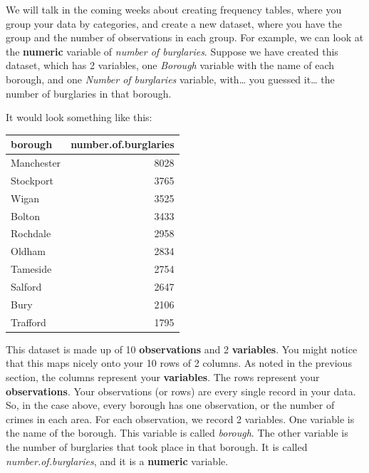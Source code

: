 \documentclass[
]{book}
\begin{document}
We will talk in the coming weeks about creating frequency tables, where you group your data by categories, and create a new dataset, where you have the group and the number of observations in each group. For example, we can look at the \textbf{numeric} variable of \emph{number of burglaries}. Suppose we have created this dataset, which has 2 variables, one \emph{Borough} variable with the name of each borough, and one \emph{Number of burglaries} variable, with\ldots{} you guessed it\ldots{} the number of burglaries in that borough.

It would look something like this:

\begin{tabular}{l|r}
\hline
borough & number.of.burglaries\\
\hline
Manchester & 8028\\
\hline
Stockport & 3765\\
\hline
Wigan & 3525\\
\hline
Bolton & 3433\\
\hline
Rochdale & 2958\\
\hline
Oldham & 2834\\
\hline
Tameside & 2754\\
\hline
Salford & 2647\\
\hline
Bury & 2106\\
\hline
Trafford & 1795\\
\hline
\end{tabular}

This dataset is made up of 10 \textbf{observations} and 2 \textbf{variables}. You might notice that this maps nicely onto your 10 rows of 2 columns. As noted in the previous section, the columns represent your \textbf{variables}. The rows represent your \textbf{observations}. Your observations (or rows) are every single record in your data. So, in the case above, every borough has one observation, or the number of crimes in each area. For each observation, we record 2 variables. One variable is the name of the borough. This variable is called \emph{borough}. The other variable is the number of burglaries that took place in that borough. It is called \emph{number.of.burglaries}, and it is a \textbf{numeric} variable.
\end{document}
